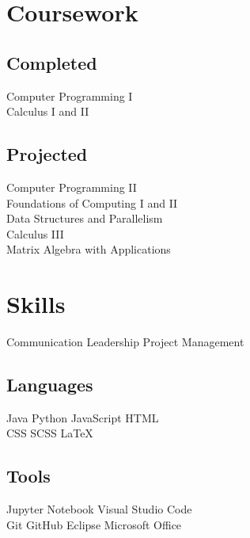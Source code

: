 \documentclass[]{deedy-resume}
\begin{document}
\begin{minipage}[t]{0.33\textwidth}

\section{Coursework}

\subsection{Completed}
Computer Programming I \\
Calculus I and II \\
\sectionsep

\subsection{Projected}
Computer Programming II \\
Foundations of Computing I and II \\
Data Structures and Parallelism \\
Calculus III \\
Matrix Algebra with Applications \\


\section{Skills}
Communication \textbullet{} Leadership \textbullet{} Project Management
\sectionsep

\subsection{Languages}
Java \textbullet{} Python \textbullet{} JavaScript \textbullet{} HTML \\
CSS \textbullet{} SCSS \textbullet{} LaTeX
\sectionsep

\subsection{Tools}
Jupyter Notebook \textbullet{} Visual Studio Code \\
Git \textbullet{} GitHub \textbullet{} Eclipse \textbullet{} Microsoft Office
\sectionsep



\end{minipage}
\end{document}

